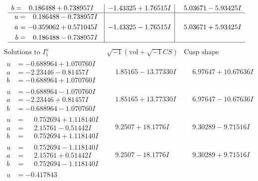 \documentclass[1p]{elsarticle_modified}
\theoremstyle{definition}
\newcommand{\I}{\sqrt{-1}}
\begin{document}
$$\begin{array}{c|c|c}
\begin{aligned}
b &= \phantom{-}0.186488 + 0.738957 I\end{aligned}
 & -1.43325 + 1.76515 I & \phantom{-}5.03671 - 5.93425 I \\ \hline\begin{aligned}
u &= \phantom{-}0.186488 - 0.738957 I \\
a &= -0.359062 + 0.571045 I \\
b &= \phantom{-}0.186488 - 0.738957 I\end{aligned}
 & -1.43325 - 1.76515 I & \phantom{-}5.03671 + 5.93425 I\\
 \hline 
 \end{array}$$\newpage$$\begin{array}{c|c|c}  
\text{Solutions to }I^u_{1}& \I (\text{vol} + \sqrt{-1}CS) & \text{Cusp shape}\\
 \hline 
\begin{aligned}
u &= -0.688964 + 1.070760 I \\
a &= -2.23446 - 0.81457 I \\
b &= -0.688964 + 1.070760 I\end{aligned}
 & \phantom{-}1.85165 - 13.77330 I & \phantom{-}6.97647 + 10.67636 I \\ \hline\begin{aligned}
u &= -0.688964 - 1.070760 I \\
a &= -2.23446 + 0.81457 I \\
b &= -0.688964 - 1.070760 I\end{aligned}
 & \phantom{-}1.85165 + 13.77330 I & \phantom{-}6.97647 - 10.67636 I \\ \hline\begin{aligned}
u &= \phantom{-}0.752694 + 1.118140 I \\
a &= \phantom{-}2.15761 - 0.51442 I \\
b &= \phantom{-}0.752694 + 1.118140 I\end{aligned}
 & \phantom{-}9.2507 + 18.1776 I & \phantom{-}9.30289 - 9.71516 I \\ \hline\begin{aligned}
u &= \phantom{-}0.752694 - 1.118140 I \\
a &= \phantom{-}2.15761 + 0.51442 I \\
b &= \phantom{-}0.752694 - 1.118140 I\end{aligned}
 & \phantom{-}9.2507 - 18.1776 I & \phantom{-}9.30289 + 9.71516 I \\ \hline\begin{aligned}
u &= -0.417843\phantom{ +0.000000I} \\

\end{aligned}
\end{array}$$
\end{document}
